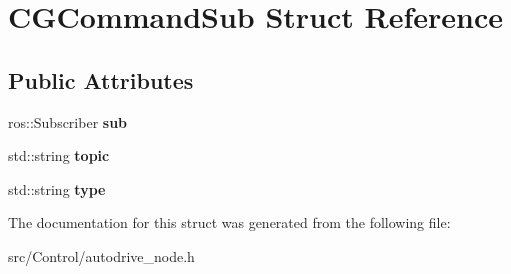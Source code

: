 \hypertarget{structCGCommandSub}{}\section{C\+G\+Command\+Sub Struct Reference}
\label{structCGCommandSub}
\subsection*{Public Attributes}
\begin{DoxyCompactItemize}
\item 
\mbox{\label{structCGCommandSub_a9faf56356fb705de16f3a3b8fb400334}} 
ros\+::\+Subscriber {\bfseries sub}
\item 
\mbox{\label{structCGCommandSub_ad69938989bd00d1eb35e421a51bf2947}} 
std\+::string {\bfseries topic}
\item 
\mbox{\label{structCGCommandSub_a05806c6a7a4215aaecc2b001692355fa}} 
std\+::string {\bfseries type}
\end{DoxyCompactItemize}


The documentation for this struct was generated from the following file\+:\begin{DoxyCompactItemize}
\item 
src/\+Control/autodrive\+\_\+node.\+h\end{DoxyCompactItemize}
